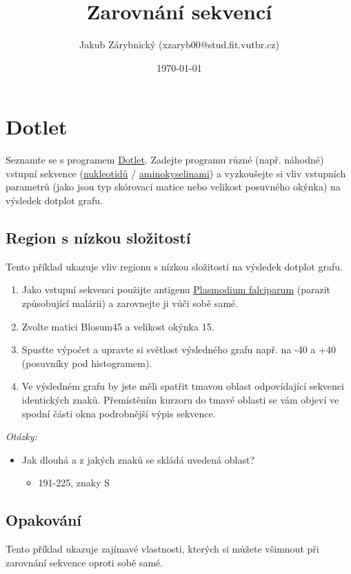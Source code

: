 \documentclass[11pt]{article}
\author{Jakub Zárybnický (xzaryb00@stud.fit.vutbr.cz)}
\date{\today}
\title{Zarovnání sekvencí}
\begin{document}
\maketitle
\tableofcontents


\section{Dotlet}
\label{sec:org7bdc741}
Seznamte se s programem \href{https://dotlet.vital-it.ch/}{Dotlet}. Zadejte programu různé (např. náhodné) vstupní
sekvence (\href{http://www.bioinformatics.org/sms2/random\_dna.html}{nukleotidů} / \href{http://www.bioinformatics.org/sms2/random\_protein.html}{aminokyselinami}) a vyzkoušejte si vliv vstupních
parametrů (jako jsou typ skórovací matice nebo velikost posuvného okýnka) na
výsledek dotplot grafu.

\subsection{Region s nízkou složitostí}
\label{sec:org97af557}
Tento příklad ukazuje vliv regionu s nízkou složitostí na výsledek dotplot
grafu.

\begin{enumerate}
\item Jako vstupní sekvenci použijte antigenu \href{data/dotlet\_lowcomp.txt}{Plasmodium falciparum} (parazit
způsobující malárii) a zarovnejte ji vůči sobě samé.
\item Zvolte matici Blosum45 a velikost okýnka 15.
\item Spusťte výpočet a upravte si světlost výsledného grafu např. na -40 a +40
(posuvníky pod histogramem).
\item Ve výsledném grafu by jste měli spatřit tmavou oblast odpovídající sekvenci
identických znaků. Přemístěním kurzoru do tmavé oblasti se vám objeví ve
spodní části okna podrobnější výpis sekvence.
\end{enumerate}

\emph{Otázky:}

\begin{itemize}
\item Jak dlouhá a z jakých znaků se skládá uvedená oblast?
\begin{itemize}
\item 191-225, znaky S
\end{itemize}
\end{itemize}

\subsection{Opakování}
\label{sec:org9a8af80}
Tento příklad ukazuje zajímavé vlastnosti, kterých si můžete všimnout
při zarovnání sekvence oproti sobě samé.
\end{document}
